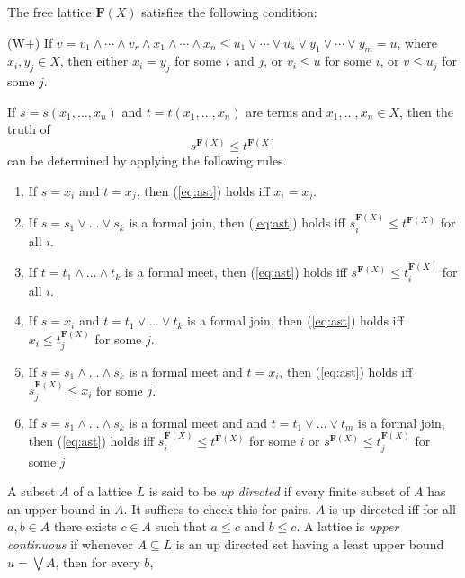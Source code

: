 {\begin{theorem}  
The free lattice $\mathbf{F}(X)$ satisfies the following condition:

(W+)  If $v = v_1 \wedge \cdots \wedge v_r \wedge x_1 \wedge \cdots
\wedge x_n \leqslant u_1 \vee \cdots \vee u_s \vee
y_1 \vee \cdots \vee y_m = u$, where $x_i, y_j\in X$, then either 
$x_i = y_j$ for some $i$ and $j$, or $v_i \leqslant u$ for some $i$, or
$v \leqslant u_j$ for some $j$. 
\end{theorem}

\begin{theorem}
If $s = s(x_1, \dots, x_n)$ and $t = t(x_1, \dots, x_n)$ are terms and $x_1, \dots, x_n \in X$, then the truth of 
\begin{equation}
  \label{eq:ast}
s^{\mathbf{F}(X)} \leqslant t^{\mathbf{F}(X)}
\end{equation}
can be determined by applying the following rules.
\begin{enumerate}
\item If $s=x_i$ and $t=x_j$, then (\ref{eq:ast}) holds iff $x_i = x_j$.
\item If $s = s_1 \vee \dots \vee s_k$ is a formal join, then (\ref{eq:ast}) holds iff $s_i^{\mathbf{F}(X)} \leqslant t^{\mathbf{F}(X)}$ for all $i$.
\item If $t = t_1 \wedge \dots \wedge t_k$ is a formal meet, then (\ref{eq:ast}) holds iff 
$s^{\mathbf{F}(X)} \leqslant t_i^{\mathbf{F}(X)}$ for all $i$.
\item If $s = x_i$ and $t = t_1 \vee \dots \vee t_k$ is a formal join, 
   then (\ref{eq:ast}) holds iff $x_i \leqslant t_j^{\mathbf{F}(X)}$ for some $j$.
\item If $s = s_1 \wedge \dots \wedge s_k$ is a formal meet and $t = x_i$, then (\ref{eq:ast}) holds iff $s_j^{\mathbf{F}(X)} \leqslant x_i$ for some $j$.
\item If $s = s_1 \wedge \dots \wedge s_k$ is a formal meet and 
and $t = t_1 \vee \dots \vee t_m$ is a formal join, then (\ref{eq:ast}) holds iff 
$s_i^{\mathbf{F}(X)} \leqslant t^{\mathbf{F}(X)}$ for some $i$
or $s^{\mathbf{F}(X)} \leqslant t_j^{\mathbf{F}(X)}$ for some $j$
\end{enumerate}

\end{theorem}

\begin{definition} A subset $A$ of a lattice $L$ is said to be \emph{up directed} if every finite subset of $A$ has an upper bound in $A$.
It suffices to check this for pairs.  $A$ is up directed iff for all $a, b \in A$
there exists $c\in A$ such that $a\leqslant c$ and $b\leqslant c$.  A lattice is \emph{upper continuous} if whenever $A\subseteq L$ is an up directed set having a least upper
bound $u = \bigvee A$, then for every $b$,


\end{definition}}
